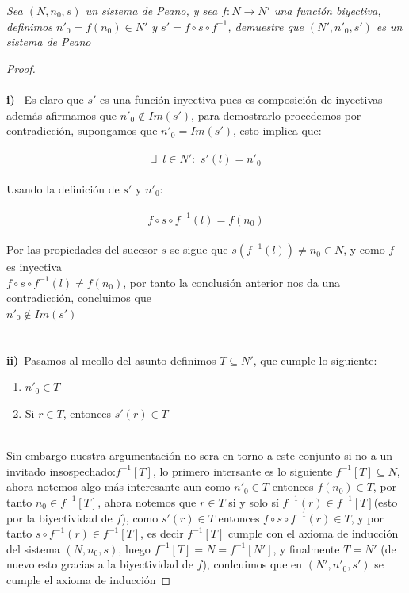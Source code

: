 \documentclass[11pt,letterpaper]{article}
\begin{document}
\begin{tcolorbox}[
	title = \textcolor{black}{\textcolor{white}{Problema }},]
\textit{Sea $(N,n_0,s)$ un sistema de Peano, y sea $f:N\rightarrow N'$ una funci\'on biyectiva, definimos
$n'_0=f(n_0)\in N'$ y $s'=f\circ s \circ f^{-1}$, demuestre que $(N',n'_0,s')$ es un sistema de Peano
}
\end{tcolorbox}
\begin{proof}\,\\
    \,\\
    \textbf{i)}\,\,\,
    Es claro que $s'$ es una funci\'on inyectiva pues es composici\'on de inyectivas adem\'as afirmamos que $n'_0\notin Im (s')$, para demostrarlo
    procedemos por contradicci\'on, supongamos que $n'_0=Im(s')$, esto implica que:\,\\
    \,\\
    \begin{equation*}
        \exists\,\,\,l\in N':\,\,s'(l)=n'_0
    \end{equation*}\,\\
    Usando la definici\'on de $s'$ y $n'_0$:\,\\
    \,\\
    \begin{equation*}
        f\circ s\circ f^{-1}(l)=f(n_0)
    \end{equation*}\,\\
    Por las propiedades del sucesor $s$ se sigue que $s(f^{-1}(l))\neq n_0\in N$, y como $f$ es inyectiva\\ $f\circ s\circ f^{-1}(l)\neq f(n_0)$,
    por tanto la conclusi\'on anterior nos da una contradicci\'on, concluimos que \\$n'_0\notin Im (s')$\,\\
    \,\\
    \newpage
    \,\\
    
    \textbf{ii)}\,\,\,Pasamos al meollo del asunto definimos $T\subseteq N'$, que cumple lo siguiente:\,\\
    \begin{enumerate}
        \item $n'_0\in T$
        \item Si $r\in T$, entonces $s'(r)\in T$
    \end{enumerate}\,\\
    Sin embargo nuestra argumentaci\'on no sera en torno a este conjunto si no a un invitado
    insospechado:$f^{-1}[T]$, lo primero intersante es lo siguiente $f^{-1}[T]\subseteq N$, ahora notemos
    algo m\'as interesante aun como $n'_0\in T$ entonces $f(n_0)\in T$, por tanto
    $n_0\in f^{-1}[T]$, ahora notemos que $r\in T$ si y solo s\'i $f^{-1}(r)\in f^{-1}[T]$(esto por la biyectividad de $f$), como 
    $s'(r)\in T$ entonces $f\circ s\circ f^{-1}(r)\in T$, y por tanto $s\circ f^{-1}(r)\in f^{-1}[T]$, es decir $f^{-1}[T]$ cumple con el axioma de inducci\'on del sistema
    $(N,n_0,s)$, luego $f^{-1}[T]=N=f^{-1}[N']$, y finalmente $T=N'$ (de nuevo esto gracias a la biyectividad de $f$),  conlcuimos que en $(N',n'_0,s')$ se cumple el axioma
    de inducci\'on
\end{proof}\,\\
\end{document}
